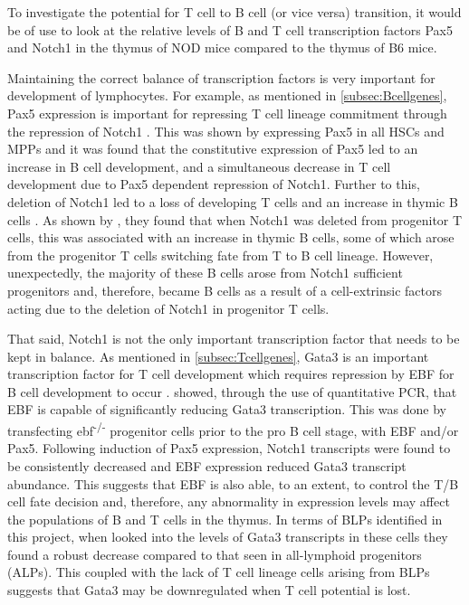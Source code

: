 To investigate the potential for T cell to B cell (or vice versa) transition, it would be of use to look at the relative levels of B and T cell transcription factors Pax5 and Notch1 in the thymus of NOD mice compared to the thymus of B6 mice.

Maintaining the correct balance of transcription factors is very important for development of lymphocytes. 
For example, as mentioned in \cref{subsec:Bcellgenes}, Pax5 expression is important for repressing T cell lineage commitment through the repression of Notch1 \citep{Souabni2002}.
This was shown by expressing Pax5 in all HSCs and MPPs and it was found that the constitutive expression of Pax5 led to an increase in B cell development, and a simultaneous decrease in T cell development due to Pax5 dependent repression of Notch1.
Further to this, deletion of Notch1 led to a loss of developing T cells and an increase in thymic B cells \citep{Feyerabend2009}.
As shown by \citet{Feyerabend2009}, they found that when Notch1 was deleted from progenitor T cells, this was associated with an increase in thymic B cells, some of which arose from the progenitor T cells switching fate from T to B cell lineage.
However, unexpectedly, the majority of these B cells arose from Notch1 sufficient progenitors and, therefore, became B cells as a result of a cell-extrinsic factors acting due to the deletion of Notch1 in progenitor T cells.

That said, Notch1 is not the only important transcription factor that needs to be kept in balance.
As mentioned in \cref{subsec:Tcellgenes}, Gata3 is an important transcription factor for T cell development which requires repression by EBF for B cell development to occur \citep{Banerjee2013}.
\citet{Banerjee2013} showed, through the use of quantitative PCR, that EBF is capable of significantly reducing Gata3 transcription.
This was done by transfecting ebf\textsuperscript{-/-} progenitor cells prior to the pro B cell stage, with EBF and/or Pax5.
Following induction of Pax5 expression, Notch1 transcripts were found to be consistently decreased and EBF expression reduced Gata3 transcript abundance.
This suggests that EBF is also able, to an extent, to control the T/B cell fate decision and, therefore, any abnormality in expression levels may affect the populations of B and T cells in the thymus.
In terms of BLPs identified in this project, when \citet{Banerjee2013} looked into the levels of Gata3 transcripts in these cells they found a robust decrease compared to that seen in all-lymphoid progenitors (ALPs).
This coupled with the lack of T cell lineage cells arising from BLPs suggests that Gata3 may be downregulated when T cell potential is lost.

